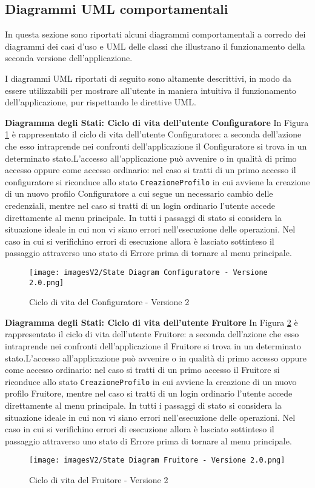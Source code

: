 \newpage
\subsection{Diagrammi UML comportamentali}
In questa sezione sono riportati alcuni diagrammi comportamentali a corredo dei diagrammi dei casi d'uso e UML delle classi che illustrano il funzionamento della seconda versione dell'applicazione.

I diagrammi UML riportati di seguito sono altamente descrittivi, in modo da essere utilizzabili per mostrare all'utente in maniera intuitiva il funzionamento dell'applicazione, pur rispettando le direttive UML.\bigskip

\newpage
\textbf{Diagramma degli Stati: Ciclo di vita dell'utente Configuratore}\newline
In Figura \ref{fig:State diagram 2.1} è rappresentato il ciclo di vita dell'utente Configuratore: a seconda dell'azione che esso intraprende nei confronti dell'applicazione il Configuratore si trova in un determinato stato.\newline L'accesso all'applicazione può avvenire o in qualità di primo accesso oppure come accesso ordinario: nel caso si tratti di un primo accesso il configuratore si riconduce allo stato \texttt{CreazioneProfilo} in cui avviene la creazione di un nuovo profilo Configuratore a cui segue un necessario cambio delle credenziali, mentre nel caso si tratti di un login ordinario l'utente accede direttamente al menu principale. \newline 
In tutti i passaggi di stato si considera la situazione ideale in cui non vi siano errori nell'esecuzione delle operazioni. Nel caso in cui si verifichino errori di esecuzione allora è lasciato sottinteso il passaggio attraverso uno stato di Errore prima di tornare al menu principale.

\begin{figure}[h!]
\centering
\texttt{[image: imagesV2/State Diagram Configuratore - Versione 2.0.png]}
\caption{\label{fig:State diagram 2.1}Ciclo di vita del Configuratore - Versione 2}
\end{figure}\bigskip

\textbf{Diagramma degli Stati: Ciclo di vita dell'utente Fruitore}\newline
In Figura \ref{fig:State diagram 2.2} è rappresentato il ciclo di vita dell'utente Fruitore: a seconda dell'azione che esso intraprende nei confronti dell'applicazione il Fruitore si trova in un determinato stato.\newline L'accesso all'applicazione può avvenire o in qualità di primo accesso oppure come accesso ordinario: nel caso si tratti di un primo accesso il Fruitore si riconduce allo stato \texttt{CreazioneProfilo} in cui avviene la creazione di un nuovo profilo Fruitore, mentre nel caso si tratti di un login ordinario l'utente accede direttamente al menu principale. \newline 
In tutti i passaggi di stato si considera la situazione ideale in cui non vi siano errori nell'esecuzione delle operazioni. Nel caso in cui si verifichino errori di esecuzione allora è lasciato sottinteso il passaggio attraverso uno stato di Errore prima di tornare al menu principale.

\begin{figure}[t!]
\centering
\texttt{[image: imagesV2/State Diagram Fruitore - Versione 2.0.png]}
\caption{\label{fig:State diagram 2.2}Ciclo di vita del Fruitore - Versione 2}
\end{figure}\bigskip